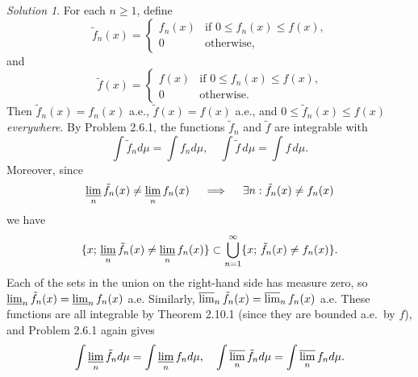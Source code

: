\documentclass{report}
\theoremstyle{remark}
\newtheorem*{solution}{Solution}
\begin{document}
\begin{solution}
  For each $n \ge 1$, define
  \begin{equation*}
    \tilde f_n(x) =
    \begin{cases}
      f_n(x) & \text{if $0 \le f_n(x) \le f(x)$,} \\
      0 & \text{otherwise,}
    \end{cases}
  \end{equation*}
  and
  \begin{equation*}
    \tilde f(x) =
    \begin{cases}
      f(x) & \text{if $0 \le f_n(x) \le f(x)$,} \\
      0 & \text{otherwise.}
    \end{cases}
  \end{equation*}
  Then $\tilde f_n(x) = f_n(x)$ a.e., $\tilde f(x) = f(x)$ a.e., and $0 \le \tilde f_n(x) \le f(x)$ \emph{everywhere}. By Problem 2.6.1, the functions $\tilde f_n$ and $\tilde f$ are integrable with
  \begin{equation*}
    \int \tilde f_n d\mu = \int f_n d\mu, \quad \int \tilde f \, d\mu = \int f \, d\mu.
  \end{equation*}
  Moreover, since
  \begin{equation*}
    \varliminf_n \tilde f_n(x) \ne \varliminf_n f_n(x) \quad \implies \quad \exists n: \tilde f_n(x) \ne f_n(x)
  \end{equation*}
  we have
  \begin{equation*}
    \{x; \, \varliminf_n \tilde f_n(x) \ne \varliminf_n f_n(x)\} \subset \bigcup_{n=1}^\infty \{x; \, \tilde f_n(x) \ne f_n(x)\}.
  \end{equation*}
  Each of the sets in the union on the right-hand side has measure zero, so $\varliminf_n \tilde f_n(x) = \varliminf_n f_n(x)$ a.e. Similarly, $\varlimsup_n \tilde f_n(x) = \varlimsup_n f_n(x)$ a.e. These functions are all integrable by Theorem 2.10.1 (since they are bounded a.e.\ by $f$), and Problem 2.6.1 again gives
  \begin{equation*}
    \int \varliminf_n \tilde f_n d\mu = \int \varliminf_n f_n d\mu, \quad \int \varlimsup_n \tilde f_n d\mu = \int \varlimsup_n f_n d\mu.
  \end{equation*}


\end{solution}
\end{document}
